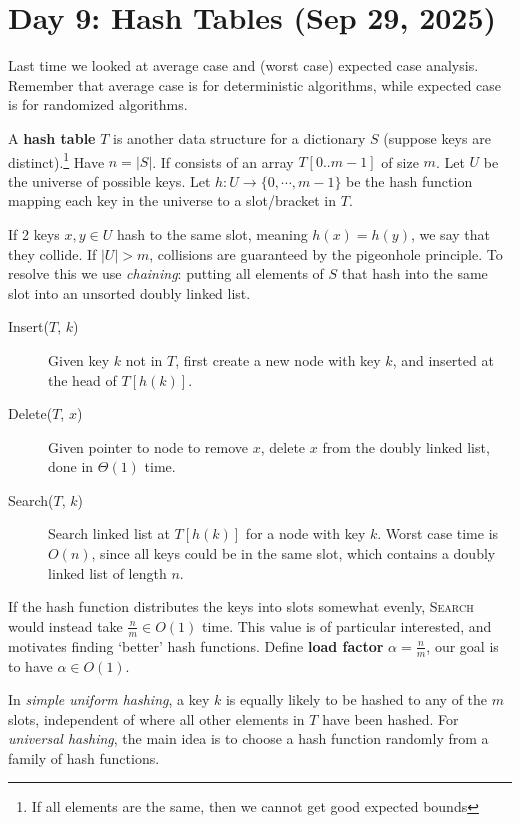 \section{Day 9: Hash Tables (Sep 29, 2025)}

Last time we looked at average case and (worst case) expected case analysis. Remember that average case is for deterministic algorithms, while expected case is for randomized algorithms.

A \textbf{hash table} $T$ is another data structure for a dictionary $S$ (suppose keys are distinct).\footnote{If all elements are the same, then we cannot get good expected bounds} Have $n = |S|$. If consists of an array $T[0..m-1]$ of size $m$. Let $U$ be the universe of possible keys. Let $h : U \to \{ 0, \cdots, m-1 \}$ be the hash function mapping each key in the universe to a slot/bracket in $T$. 

If 2 keys $x, y \in U$ hash to the same slot, meaning $h(x) = h(y)$, we say that they collide. If $|U| > m$, collisions are guaranteed by the pigeonhole principle. To resolve this we use \textit{chaining}: putting all elements of $S$ that hash into the same slot into an unsorted doubly linked list. 

\begin{description}
    \item[Insert($T$, $k$)] Given key $k$ not in $T$, first create a new node with key $k$, and inserted at the head of $T[h(k)]$.
    \item[Delete($T$, $x$)] Given pointer to node to remove $x$, delete $x$ from the doubly linked list, done in $\Theta(1)$ time.
    \item[Search($T$, $k$)] Search linked list at $T[h(k)]$ for a node with key $k$. Worst case time is $O(n)$, since all keys could be in the same slot, which contains a doubly linked list of length $n$.
\end{description}

If the hash function distributes the keys into slots somewhat evenly, \textsc{Search} would instead take $\frac{n}{m} \in O(1)$ time. This value is of particular interested, and motivates finding `better' hash functions. Define \textbf{load factor} $\alpha = \frac{n}{m}$, our goal is to have $\alpha \in O(1)$.

In \textit{simple uniform hashing}, a key $k$ is equally likely to be hashed to any of the $m$ slots, independent of where all other elements in $T$ have been hashed. For \textit{universal hashing}, the main idea is to choose a hash function randomly from a family of hash functions.

